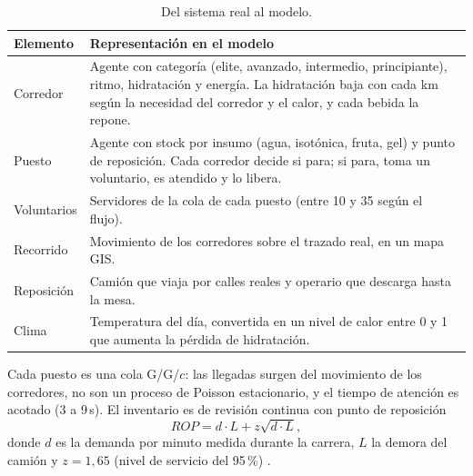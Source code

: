 \documentclass[11pt,a4paper]{article}
\begin{document}
\begin{table}[H]
\centering
\small
\begin{tabular}{lP{12.6cm}}
\toprule
\textbf{Elemento} & \textbf{Representación en el modelo} \\
\midrule
Corredor & Agente con categoría (elite, avanzado, intermedio, principiante), ritmo, hidratación y energía. La hidratación baja con cada km según la necesidad del corredor y el calor, y cada bebida la repone. \\
Puesto & Agente con stock por insumo (agua, isotónica, fruta, gel) y punto de reposición. Cada corredor decide si para; si para, toma un voluntario, es atendido y lo libera. \\
Voluntarios & Servidores de la cola de cada puesto (entre 10 y 35 según el flujo). \\
Recorrido & Movimiento de los corredores sobre el trazado real, en un mapa GIS. \\
Reposición & Camión que viaja por calles reales y operario que descarga hasta la mesa. \\
Clima & Temperatura del día, convertida en un nivel de calor entre 0 y 1 que aumenta la pérdida de hidratación. \\
\bottomrule
\end{tabular}
\caption{Del sistema real al modelo.}
\label{tab:conceptual}
\end{table}

Cada puesto es una cola G/G/$c$: las llegadas surgen del movimiento de los corredores, no son un proceso de Poisson estacionario, y el tiempo de atención es acotado (3 a 9\,s). El inventario es de revisión continua con punto de reposición
\begin{equation}
    ROP = d \cdot L + z \sqrt{d \cdot L},
\end{equation}
donde $d$ es la demanda por minuto medida durante la carrera, $L$ la demora del camión y $z = 1{,}65$ (nivel de servicio del 95\,\%) \cite{silver}.
\end{document}
